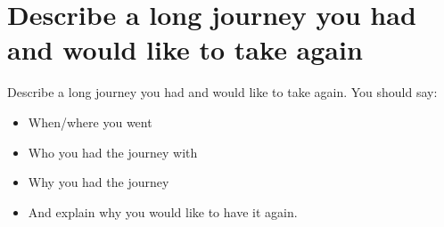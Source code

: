 \section{Describe a long journey you had and would like to take again}
\begin{ieltsprompt}
Describe a long journey you had and would like to take again.
You should say:
\begin{itemize}[leftmargin=2em, itemsep=2pt]
\item When/where you went
\item Who you had the journey with
\item Why you had the journey
\item And explain why you would like to have it again.
\end{itemize}
\end{ieltsprompt}
